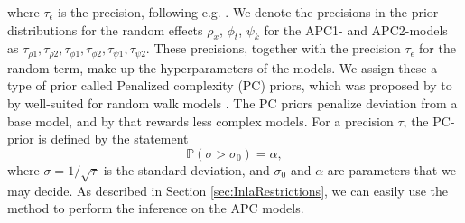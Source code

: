 where $\tau_\epsilon$ is the precision, following e.g. \textcite{Besag1995}. We denote the precisions in the prior distributions for the random effects $\rho_x$, $\phi_t$, $\psi_k$ for the APC1- and APC2-models as $\tau_{\rho 1}, \tau_{\rho 2}, \tau_{\phi 1}, \tau_{\phi 2}, \tau_{\psi 1}, \tau_{\psi 2}$. These precisions, together with the precision $\tau_\epsilon$ for the random term, make up the hyperparameters of the models. We assign these a type of prior called Penalized complexity (PC) priors, which was proposed by \textcite{SimpsonRueRiebler2017} to by well-suited for random walk models \parencite{Rubio2020}. The PC priors penalize deviation from a base model, and by that rewards less complex models. For a precision $\tau$, the PC-prior is defined by the statement \begin{equation}
    \mathbb{P}(\sigma > \sigma_0) = \alpha,
\end{equation}
where $\sigma = 1/\sqrt{\tau}$ is the standard deviation, and $\sigma_0$ and $\alpha$ are parameters that we may decide. As described in Section \ref{sec:InlaRestrictions}, we can easily use the \inla method to perform the inference on the APC models. 


